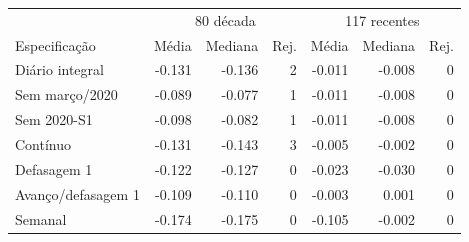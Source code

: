 \begin{tabular}{lrrrrrr}
\toprule
& \multicolumn{3}{c}{80 década} & \multicolumn{3}{c}{117 recentes}\\
Especificação & Média & Mediana & Rej. & Média & Mediana & Rej.\\
\midrule
Diário integral & -0.131 & -0.136 & 2 & -0.011 & -0.008 & 0\\
Sem março/2020 & -0.089 & -0.077 & 1 & -0.011 & -0.008 & 0\\
Sem 2020-S1 & -0.098 & -0.082 & 1 & -0.011 & -0.008 & 0\\
Contínuo & -0.131 & -0.143 & 3 & -0.005 & -0.002 & 0\\
Defasagem 1 & -0.122 & -0.127 & 0 & -0.023 & -0.030 & 0\\
Avanço/defasagem 1 & -0.109 & -0.110 & 0 & -0.003 & 0.001 & 0\\
Semanal & -0.174 & -0.175 & 0 & -0.105 & -0.002 & 0\\
\bottomrule
\end{tabular}
